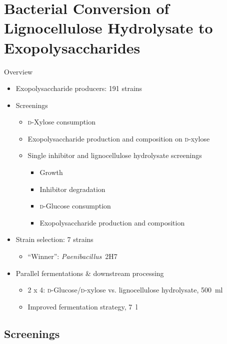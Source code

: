 \documentclass[mathserif]{beamer}
\newcommand{\SIl}[1]{\SI{#1}{\l}} %
\newcommand{\SIml}[1]{\SI{#1}{\ml}} %
\newcommand{\mo}[1]{\emph{#1}} %
\newcommand{\strain}{\mo{Paenibacillus}~2H7} %
\newcommand{\LCH}{Lignocellulose Hydrolysate}
\newcommand{\lch}{lignocellulose hydrolysate}
\newcommand{\EPS}{Exopolysaccharide}
\newcommand{\GLC}{\textsc{d}-Glu\-cose}
\newcommand{\XYL}{\textsc{d}-Xy\-lose}
\newcommand{\xyl}{\textsc{d}-xy\-lose}
\begin{document}
\section{Bacterial Conversion of \LCH{} to \EPS{}s}

\begin{frame}{Overview}{}
	\begin{itemize}
		\item \EPS{} producers: 191 strains
		\pause
		\item Screenings
			\begin{itemize}
				\item \XYL{} consumption
				\item \EPS{} production and composition on \xyl{}
				\item Single inhibitor and \lch{} screenings
					\begin{itemize}
						\item Growth
						\item Inhibitor degradation
						\item \GLC{} consumption
						\item \EPS{} production and composition
					\end{itemize}
			\end{itemize}
		\pause
		\item Strain selection: 7 strains
			\begin{itemize}
				\item \enquote{Winner}: \strain{}
			\end{itemize}
		\pause
		\item Parallel fermentations \& downstream processing
			\begin{itemize}
				\item 2 x 4: \GLC{}/\xyl{} vs. \lch{}, \SIml{500}
				\item {\color{isulightgrey}Improved fermentation strategy, \SIl{7}}
			\end{itemize}
	\end{itemize}
\end{frame}

\subsection{Screenings}
\end{document}
